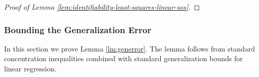\begin{proof}[Proof of Lemma \ref{lem:identifiability-least-squares-linear-sos}]









\end{proof}


\subsubsection{Bounding the Generalization Error}
In this section we prove Lemma \ref{lm:generror}. The lemma follows from standard concentration inequalities combined with standard generalization bounds for linear regression. 


